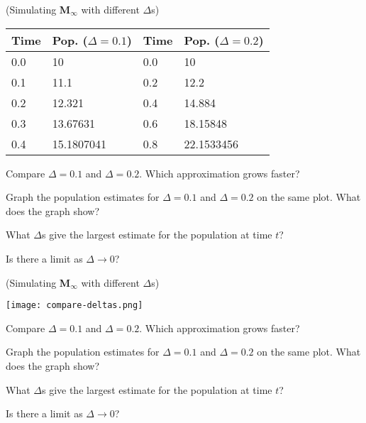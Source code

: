 \documentclass{workbook}
\begin{document}
\begin{slide}
	\question
	(Simulating \textbf{M$_\infty$} with different $\Delta$s)
	
	\begin{center}
	\begin{tabular}{l|l|l|l}
		Time & Pop. ($\Delta=0.1$) & Time & Pop. ($\Delta=0.2$)\\
		\hline
		0.0&	10&		0.0&	10\\
		0.1&	11.1&		0.2&	12.2\\
		0.2&	12.321&		0.4&	14.884\\
		0.3&	13.67631&	0.6&	18.15848\\
		0.4&	15.1807041&	0.8&	22.1533456
	\end{tabular}
	\end{center}

	\begin{parts}
		\item Compare $\Delta=0.1$ and $\Delta=0.2$. Which approximation grows faster?
		\item Graph the population estimates for $\Delta=0.1$ and $\Delta=0.2$ on the same plot. What does the graph show?

		\vspace{1cm}
		\item What $\Delta$s give the largest estimate for the population at time $t$?
		\item Is there a limit as $\Delta\to 0$?
	\end{parts}
\end{slide}

\begin{slide}
	(Simulating \textbf{M$_\infty$} with different $\Delta$s)
	
	\texttt{[image: compare-deltas.png]}

	\begin{parts}
		\item Compare $\Delta=0.1$ and $\Delta=0.2$. Which approximation grows faster?
		\item Graph the population estimates for $\Delta=0.1$ and $\Delta=0.2$ on the same plot. What does the graph show?

		\vspace{1cm}
		\item What $\Delta$s give the largest estimate for the population at time $t$?
		\item Is there a limit as $\Delta\to 0$?
	\end{parts}
\end{slide}
\end{document}
